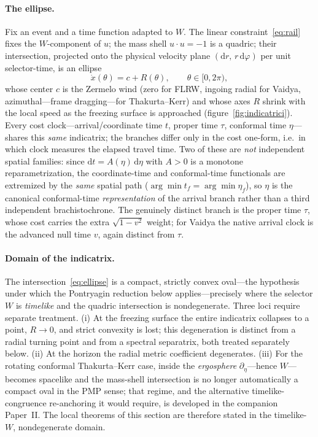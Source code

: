\documentclass[12pt]{iopart}
\newcommand{\dd}{\mathrm{d}}
\theoremstyle{plain}
\theoremstyle{definition}
\theoremstyle{plain}
\theoremstyle{remark}
\begin{document}
\paragraph{The ellipse.} Fix an event and a time function adapted to $W$. The
linear constraint~\eqref{eq:rail} fixes the $W$-component of $u$; the mass shell
$u\cdot u=-1$ is a quadric; their intersection, projected onto the physical
velocity plane $(\dd r,\,r\,\dd\varphi)$ per unit selector-time, is an ellipse
\begin{equation}
    \dot x(\theta)=c+R(\theta),\qquad \theta\in[0,2\pi),
    \label{eq:ellipse}
\end{equation}
whose center $c$ is the Zermelo wind (zero for FLRW, ingoing radial for Vaidya,
azimuthal---frame dragging---for Thakurta--Kerr) and whose axes $R$ shrink with
the local speed as the freezing surface is approached (figure~\ref{fig:indicatrici}).
Every cost clock---arrival/coordinate time $t$, proper time $\tau$, conformal time
$\eta$---shares this \emph{same} indicatrix; the branches differ only in the cost
one-form, i.e.\ in which clock measures the elapsed travel time. Two of these are
\emph{not} independent spatial families: since $\dd t=A(\eta)\,\dd\eta$ with $A>0$ is
a monotone reparametrization, the coordinate-time and conformal-time functionals are
extremized by the \emph{same} spatial path ($\arg\min t_f=\arg\min\eta_f$), so $\eta$
is the canonical conformal-time \emph{representation} of the arrival branch rather
than a third independent brachistochrone. The genuinely distinct branch is the proper
time $\tau$, whose cost carries the extra $\sqrt{1-v^2}$ weight; for Vaidya the native
arrival clock is the advanced null time $v$, again distinct from $\tau$.

\paragraph{Domain of the indicatrix.} The intersection~\eqref{eq:ellipse} is a
compact, strictly convex oval---the hypothesis under which the Pontryagin reduction
below applies---precisely where the selector $W$ is \emph{timelike} and the quadric
intersection is nondegenerate. Three loci require separate treatment. (i) At the
freezing surface the entire indicatrix collapses to a point, $R\to0$, and strict
convexity is lost; this degeneration is distinct from a radial turning point and
from a spectral separatrix, both treated separately below. (ii) At the horizon the
radial metric coefficient degenerates. (iii) For the rotating conformal
Thakurta--Kerr case, inside the \emph{ergosphere} $\partial_\eta$---hence
$W$---becomes spacelike and the mass-shell intersection is no longer automatically a
compact oval in the PMP sense; that regime, and the alternative timelike-congruence
re-anchoring it would require, is developed in the companion Paper~II. The local
theorems of this section are therefore stated in the timelike-$W$, nondegenerate
domain.
\end{document}

